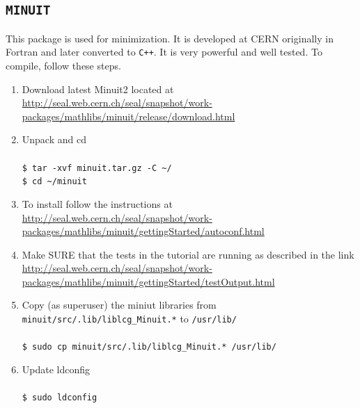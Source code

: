 \documentclass[10pt,letterpaper,oneside]{article}
\newcommand{\cpp}{\texttt{C++}}
\newcommand{\minuit}{\texttt{MINUIT}}
\begin{document}
\subsection{\minuit}
This package is used for minimization. It is developed at CERN originally in Fortran and later converted to \cpp. It is very powerful
and well tested. To compile, follow these steps.
\begin{enumerate}
 \item  Download latest Minuit2 located at\\
\url{http://seal.web.cern.ch/seal/snapshot/work-packages/mathlibs/minuit/release/download.html}
 \item Unpack and cd\\
      \\     \verb+$ tar -xvf minuit.tar.gz -C ~/+
      \\     \verb+$ cd ~/minuit+

 \item  To install follow the instructions at
\\   \url{http://seal.web.cern.ch/seal/snapshot/work-packages/mathlibs/minuit/gettingStarted/autoconf.html}

 \item  Make SURE that the tests in the tutorial are running as described in the link \\ \url{http://seal.web.cern.ch/seal/snapshot/work-packages/mathlibs/minuit/gettingStarted/testOutput.html}
  \item Copy (as superuser) the miniut libraries from   
  \verb+minuit/src/.lib/liblcg_Minuit.*+ to \verb+/usr/lib/+ 
  \\ \\ \verb+$ sudo cp minuit/src/.lib/liblcg_Minuit.* /usr/lib/+

  \item Update ldconfig
 \\ \\ \verb+$ sudo ldconfig+
\end{enumerate}
\end{document}

